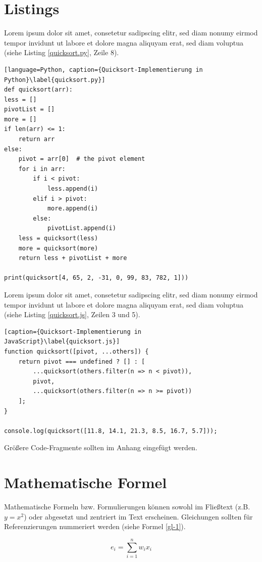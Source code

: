\section{Listings}

Lorem ipsum dolor sit amet, consetetur sadipscing elitr, sed diam nonumy eirmod tempor invidunt ut labore et dolore magna aliquyam erat, sed diam voluptua (siehe Listing \ref{quicksort.py}, Zeile 8).

\begin{lstlisting}[language=Python, caption={Quicksort-Implementierung in Python}\label{quicksort.py}]
def quicksort(arr):
less = []
pivotList = []
more = []
if len(arr) <= 1:
	return arr
else:
	pivot = arr[0]	# the pivot element
	for i in arr:
		if i < pivot:
			less.append(i)
		elif i > pivot:
			more.append(i)
		else:
			pivotList.append(i)
	less = quicksort(less)
	more = quicksort(more)
	return less + pivotList + more

print(quicksort[4, 65, 2, -31, 0, 99, 83, 782, 1]))
\end{lstlisting}

Lorem ipsum dolor sit amet, consetetur sadipscing elitr, sed diam nonumy eirmod tempor invidunt ut labore et dolore magna aliquyam erat, sed diam voluptua (siehe Listing \ref{quicksort.js}, Zeilen 3 und 5).

\begin{lstlisting}[caption={Quicksort-Implementierung in JavaScript}\label{quicksort.js}]
function quicksort([pivot, ...others]) {
	return pivot === undefined ? [] : [
		...quicksort(others.filter(n => n < pivot)),
		pivot,
		...quicksort(others.filter(n => n >= pivot))
	];
}

console.log(quicksort([11.8, 14.1, 21.3, 8.5, 16.7, 5.7]));
\end{lstlisting}

Größere Code-Fragmente sollten im Anhang eingefügt werden. \cite{wiki:listing}

\section{Mathematische Formel}

Mathematische Formeln bzw. Formulierungen können sowohl im Fließtext (z.B. $y=x^2$) oder abgesetzt und zentriert im Text erscheinen. Gleichungen sollten für Referenzierungen nummeriert werden (siehe Formel \ref{gl-1}).

\begin{equation}
	\label{gl-1}
	e_{i}=\sum _{i=1}^{n}w_{i}x_{i}
\end{equation}

